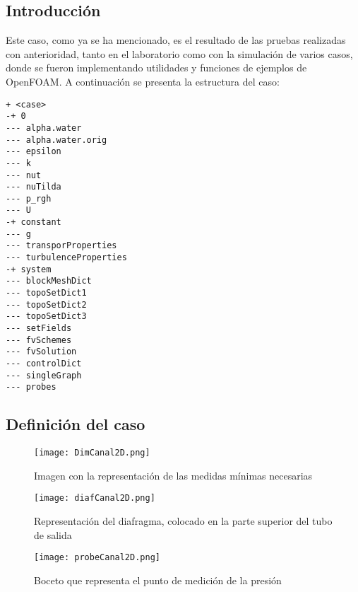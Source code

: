 \subsection{Introducción}\label{header-n2}
Este caso, como ya se ha mencionado, es el resultado de las pruebas
realizadas con anterioridad, tanto en el laboratorio como con la
simulación de varios casos, donde se fueron implementando utilidades y
funciones de ejemplos de OpenFOAM. A continuación se presenta la
estructura del caso:

\begin{verbatim}
+ <case>
-+ 0
--- alpha.water
--- alpha.water.orig
--- epsilon
--- k
--- nut
--- nuTilda
--- p_rgh
--- U
-+ constant
--- g
--- transporProperties
--- turbulenceProperties
-+ system
--- blockMeshDict
--- topoSetDict1
--- topoSetDict2
--- topoSetDict3
--- setFields
--- fvSchemes
--- fvSolution
--- controlDict
--- singleGraph
--- probes
\end{verbatim}

\subsection{Definición del caso}\label{header-n9}

\begin{figure}
\centering
\texttt{[image: DimCanal2D.png]}
\caption{Imagen con la representación de las medidas mínimas necesarias}
\label{fig:DimCanal2D}
\end{figure}

\begin{figure}
\centering
\texttt{[image: diafCanal2D.png]}
\caption[Representación del diafragma]{Representación del diafragma, colocado en la parte superior del tubo de salida}
\label{fig:diafCanal2D}
\end{figure}

\begin{figure}
\centering
\texttt{[image: probeCanal2D.png]}
\caption{Boceto que representa el punto de medición de la presión}
\label{fig:probeCanal2D}
\end{figure}


